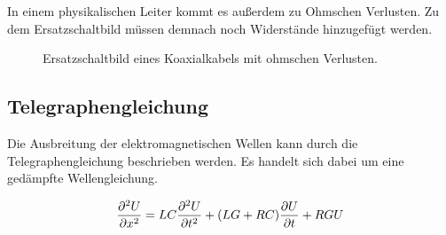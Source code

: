 In einem physikalischen Leiter kommt es außerdem zu Ohmschen Verlusten. Zu dem Ersatzschaltbild müssen demnach noch Widerstände hinzugefügt werden.
\begin{figure}
  \centering
  
  \caption{Ersatzschaltbild eines Koaxialkabels mit ohmschen Verlusten.}
  \label{fig:circuit_ohm}
\end{figure}


\subsection{Telegraphengleichung}
Die Ausbreitung der elektromagnetischen Wellen kann durch die Telegraphengleichung beschrieben werden.
Es handelt sich dabei um eine gedämpfte Wellengleichung.

\begin{equation}
  \label{eq:telegraph}
  \frac{\partial^2 U}{\partial x^2} = LC  \frac{\mathinner{\partial^2 U}}{\mathinner{\partial t^2} } + (LG + RC) \frac{\mathinner{\partial U}}{\mathinner{\partial t} } + RGU
\end{equation}
